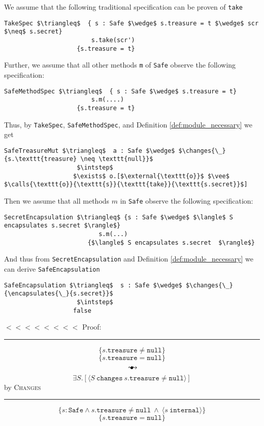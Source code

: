 \documentclass[12pt]{article}
\newcommand\trans{\mathlarger{\mathlarger \leadsto}}
\newcommand\intstep{\hspace{1.5mm}{\raisebox{3pt}{$\bullet$}}\hspace{-1.5mm}{\hookrightarrow}}
\newcommand\ot{\hspace{2mm}{\raisebox{1pt}{$\bullet$}}\hspace{-3mm}{\trans}}
\newcommand\encapsulates[2]{\langle #1\ \texttt{encapsulates}\ #2 \rangle}
\newcommand\calls[4]{\langle #1\ \texttt{calls}\ #2.#3(#4) \rangle}
\newcommand\changes[2]{\langle #1\ \texttt{changes}\ #2 \rangle}
\newcommand\internal[1]{\langle #1\ \texttt{internal}\rangle}
\newcommand\external[1]{\langle #1\ \texttt{external}\rangle}
\numberwithin{case}{lemma}
\numberwithin{case}{theorem}
\numberwithin{subcase}{case}
\begin{document}
We assume that the following traditional specification can be proven of \texttt{take}
\begin{lstlisting}[mathescape=true]
TakeSpec $\triangleq$  { s : Safe $\wedge$ s.treasure = t $\wedge$ scr $\neq$ s.secret}
                        s.take(scr')
                    {s.treasure = t}
\end{lstlisting}
Further, we assume that all other methods \texttt{m} of \texttt{Safe} observe the following specification:
\begin{lstlisting}[mathescape=true]
SafeMethodSpec $\triangleq$  { s : Safe $\wedge$ s.treasure = t}
                        s.m(....)
                    {s.treasure = t}
\end{lstlisting}
Thus, by \texttt{TakeSpec}, \texttt{SafeMethodSpec}, and Definition \ref{def:module_necessary} we get
\begin{lstlisting}[mathescape=true]
SafeTreasureMut $\triangleq$  a : Safe $\wedge$ $\changes{\_}{s.\texttt{treasure} \neq \texttt{null}}$
                    $\intstep$
                   $\exists$ o.[$\external{\texttt{o}}$ $\vee$ $\calls{\texttt{o}}{\texttt{s}}{\texttt{take}}{\texttt{s.secret}}$]
\end{lstlisting}
Then we assume that all methods $m$ in \texttt{Safe} observe the following specification:
\begin{lstlisting}[mathescape=true]
SecretEncapsulation $\triangleq$ {s : Safe $\wedge$ $\langle$ S encapsulates s.secret $\rangle$}
				          s.m(...)
				       {$\langle$ S encapsulates s.secret  $\rangle$}
\end{lstlisting}
And thus from \texttt{SecretEncapsulation} and Definition \ref{def:module_necessary} we can derive \texttt{SafeEncapsulation}
\begin{lstlisting}[mathescape=true]
SafeEncapsulation $\triangleq$  s : Safe $\wedge$ $\changes{\_}{\encapsulates{\_}{s.secret}}$
                    $\intstep$
                   false
\end{lstlisting}
{\color{Green} $<<<<<<<<$}
\noindent Proof:
\vspace{3mm}
\footnotesize
\hrule
\vspace{3mm}
$$
	\{s.\texttt{treasure} \neq \texttt{null}\}
$$
$$
	\{s.\texttt{treasure} = \texttt{null} \}
$$
$$\ot$$
$$
	\exists S.[\changes{S}{s.\texttt{treasure} \neq \texttt{null}}]
$$
\hfill by \textsc{Changes}
\hrule
\vspace{3mm}
$$
	\{s : \texttt{Safe} \wedge s.\texttt{treasure} \neq \texttt{null}\ \wedge\ \internal{s}\}
$$
$$
	\{s.\texttt{treasure} = \texttt{null} \}
$$
\end{document}
